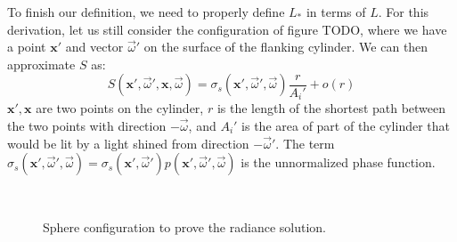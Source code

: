 To finish our definition, we need to properly define $L_*$ in terms of $L$. For this derivation, let us still consider the configuration of figure TODO, where we have a point $\mathbf{x}'$ and vector $\vec{\omega}'$ on the surface of the flanking cylinder. We can then approximate $S$ as:
$$
S(\mathbf{x}', \vec{\omega}', \mathbf{x}, \vec{\omega}) = \sigma_s(\mathbf{x}', \vec{\omega}', \vec{\omega}) \frac{r}{A_i'} + o(r)
$$
$\mathbf{x}', \mathbf{x}$ are two points on the cylinder, $r$ is the length of the shortest path between the two points with direction $-\vec{\omega}$, and $A_i'$ is the area of part of the cylinder that would be lit by a light shined from direction $-\vec{\omega}'$. The term $\sigma_s(\mathbf{x}', \vec{\omega}', \vec{\omega}) = \sigma_s(\mathbf{x}', \vec{\omega}') p(\mathbf{x}', \vec{\omega}', \vec{\omega})$ is the unnormalized phase function.

\begin{figure}
\centering
   \def\svgwidth{0.8\textwidth}
    \\
\caption{Sphere configuration to prove the radiance solution.} %
\label{fig:sphere}
\end{figure}

